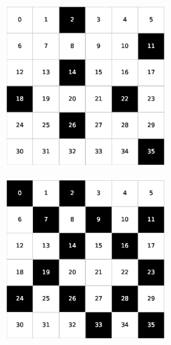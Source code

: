 \newpage
\begin{figure}[h!]
    \vspace*{1cm}
    \centering
    \begin{subfigure}[b]{\textwidth}
        \centering
        \begin{subfigure}[b]{0.20\textwidth}
            \includegraphics[width=\columnwidth]{images/Tai36c_6x6_20.eps}
        \end{subfigure}
        \hspace{3em}
        \begin{subfigure}[b]{0.20\textwidth}
            \includegraphics[width=\columnwidth]{images/Tai36c_6x6_40.eps}

\end{subfigure}
\end{subfigure}
\end{figure}

